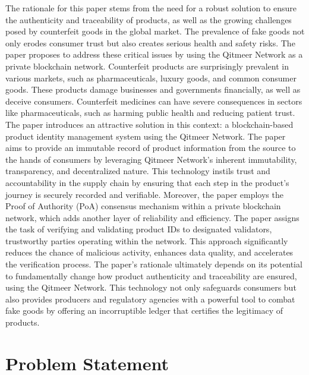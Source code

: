 \documentclass[12pt,a4letter]{article}
\begin{document}
The rationale for this paper stems from the need for a robust solution to ensure the authenticity and traceability of products, as well as the growing challenges posed by counterfeit goods in the global market. The prevalence of fake goods not only erodes consumer trust but also creates serious health and safety risks. The paper proposes to address these critical issues by using the Qitmeer Network as a private blockchain network. Counterfeit products are surprisingly prevalent in various markets, such as pharmaceuticals, luxury goods, and common consumer goods. These products damage businesses and governments financially, as well as deceive consumers. Counterfeit medicines can have severe consequences in sectors like pharmaceuticals, such as harming public health and reducing patient trust. The paper introduces an attractive solution in this context: a blockchain-based product identity management system using the Qitmeer Network. The paper aims to provide an immutable record of product information from the source to the hands of consumers by leveraging Qitmeer Network's inherent immutability, transparency, and decentralized nature. This technology instils trust and accountability in the supply chain by ensuring that each step in the product’s journey is securely recorded and verifiable. Moreover, the paper employs the Proof of Authority (PoA) consensus mechanism within a private blockchain network, which adds another layer of reliability and efficiency. The paper assigns the task of verifying and validating product IDs to designated validators, trustworthy parties operating within the network. This approach significantly reduces the chance of malicious activity, enhances data quality, and accelerates the verification process. The paper’s rationale ultimately depends on its potential to fundamentally change how product authenticity and traceability are ensured, using the Qitmeer Network. This technology not only safeguards consumers but also provides producers and regulatory agencies with a powerful tool to combat fake goods by offering an incorruptible ledger that certifies the legitimacy of products.

\section*{Problem Statement}
\end{document}
